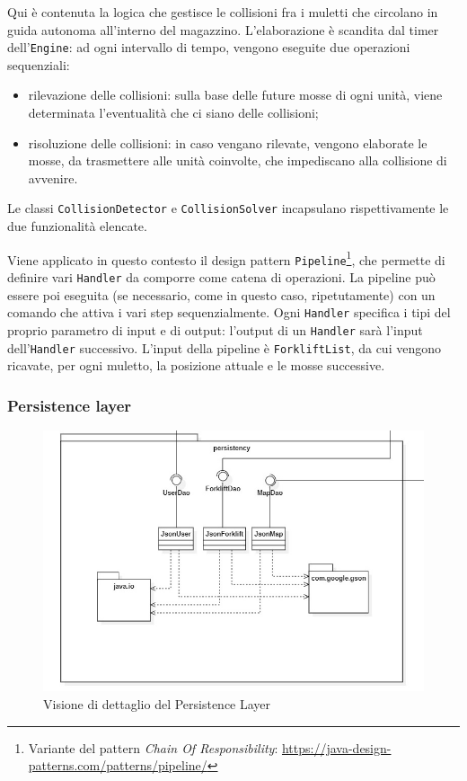 Qui è contenuta la logica che gestisce le collisioni fra i muletti che circolano in guida autonoma all'interno del magazzino. L'elaborazione è scandita dal timer dell'\texttt{Engine}: ad ogni intervallo di tempo, vengono eseguite due operazioni sequenziali:
\begin{itemize}
	\item rilevazione delle collisioni: sulla base delle future mosse di ogni unità, viene determinata l'eventualità che ci siano delle collisioni;
	\item risoluzione delle collisioni: in caso vengano rilevate, vengono elaborate le mosse, da trasmettere alle unità coinvolte, che impediscano alla collisione di avvenire.
\end{itemize}
Le classi \texttt{CollisionDetector} e \texttt{CollisionSolver} incapsulano rispettivamente le due funzionalità elencate.

Viene applicato in questo contesto il design pattern \texttt{Pipeline}\footnote{Variante del pattern \textit{Chain Of Responsibility}: \url{https://java-design-patterns.com/patterns/pipeline/}}, che permette di definire vari \texttt{Handler} da comporre come catena di operazioni. La pipeline può essere poi eseguita (se necessario, come in questo caso, ripetutamente) con un comando che attiva i vari step sequenzialmente. Ogni \texttt{Handler} specifica i tipi del proprio parametro di input e di output: l'output di un \texttt{Handler} sarà l'input dell'\texttt{Handler} successivo.
L'input della pipeline è \texttt{ForkliftList}, da cui vengono ricavate, per ogni muletto, la posizione attuale e le mosse successive.



\subsubsection{Persistence layer}

\begin{figure}[H]
	\centering
	\includegraphics[scale=0.50]{res/diagrams/server/server_persistency.jpg}
	\caption{Visione di dettaglio del Persistence Layer}
\end{figure}

